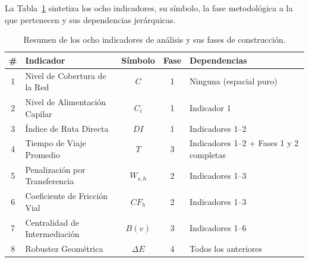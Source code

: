 La Tabla~\ref{tab:resumen-indicadores} sintetiza los ocho indicadores, su
símbolo,
la fase metodológica a la que pertenecen y sus dependencias jerárquicas.
 
\begin{table}[H]
    \centering
    \caption{Resumen de los ocho indicadores de análisis y sus fases de
             construcción.}
    \label{tab:resumen-indicadores}
    \begin{tabularx}{\textwidth}{c l c c X}
        \toprule
        \textbf{\#} & \textbf{Indicador} & \textbf{Símbolo} &
        \textbf{Fase} & \textbf{Dependencias} \\
        \midrule
        1 & Nivel de Cobertura de la Red     & $C$          & 1 & Ninguna (espacial puro) \\
        2 & Nivel de Alimentación Capilar    & $C_i$        & 1 & Indicador 1 \\
        3 & Índice de Ruta Directa           & $DI$         & 1 & Indicadores 1--2 \\
        4 & Tiempo de Viaje Promedio         & $T$          & 3 & Indicadores 1--2 + Fases 1 y 2 completas \\
        5 & Penalización por Transferencia   & $W_{s,h}$    & 2 & Indicadores 1--3 \\
        6 & Coeficiente de Fricción Vial     & $CF_h$       & 2 & Indicadores 1--3 \\
        7 & Centralidad de Intermediación    & $B(v)$       & 3 & Indicadores 1--6 \\
        8 & Robustez Geométrica              & $\Delta E$   & 4 & Todos los anteriores \\
        \bottomrule
    \end{tabularx}
\end{table}